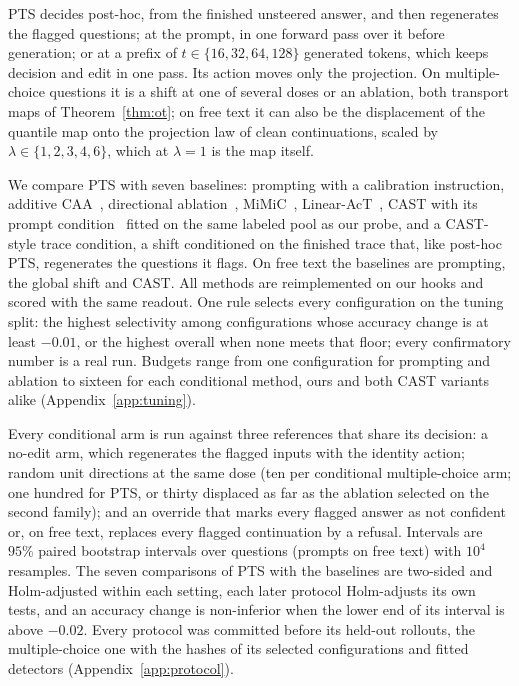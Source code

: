 PTS decides post-hoc, from the finished unsteered answer, and then regenerates
the flagged questions; at the prompt, in one forward pass over it before
generation; or at a prefix of $t\in\{16,32,64,128\}$ generated tokens, which
keeps decision and edit in one pass. Its action moves only the projection. On
multiple-choice questions it is a shift at one of several doses or an
ablation, both transport maps of Theorem~\ref{thm:ot}; on free text it can
also be the displacement of the quantile map onto the projection law of clean
continuations, scaled by $\lambda\in\{1,2,3,4,6\}$, which at $\lambda=1$ is
the map itself.

We compare PTS with seven baselines: prompting with a calibration instruction,
additive CAA~\citep{rimsky2024caa}, directional
ablation~\citep{arditi2024refusal}, MiMiC~\citep{singh2024mimic},
Linear-AcT~\citep{rodriguez2025act}, CAST with its prompt
condition~\citep{lee2024cast} fitted on the same labeled pool as our probe, and
a CAST-style trace condition, a shift conditioned on the finished trace that,
like post-hoc PTS, regenerates the questions it flags. On free text the
baselines are prompting, the global shift and CAST. All methods are
reimplemented on our hooks and scored with the same readout. One rule selects
every configuration on the tuning split: the highest selectivity among
configurations whose accuracy change is at least $-0.01$, or the highest
overall when none meets that floor; every confirmatory number is a real run.
Budgets range from one configuration for prompting and ablation to sixteen
for each conditional method, ours and both CAST variants alike
(Appendix~\ref{app:tuning}).

Every conditional arm is run against three references that share its decision:
a no-edit arm, which regenerates the flagged inputs with the identity action;
random unit directions at the same dose (ten per conditional multiple-choice
arm; one hundred for PTS, or thirty displaced as far as the ablation selected
on the second family); and an override that marks every flagged answer as not
confident or, on free text, replaces every flagged continuation by a refusal.
Intervals are $95\%$ paired bootstrap intervals over questions (prompts on free
text) with $10^4$ resamples. The seven comparisons of PTS with the baselines
are two-sided and Holm-adjusted within each setting, each later protocol
Holm-adjusts its own tests, and an accuracy change is non-inferior when the
lower end of its interval is above $-0.02$. Every protocol was committed before
its held-out rollouts, the multiple-choice one with the hashes of its selected
configurations and fitted detectors (Appendix~\ref{app:protocol}).

